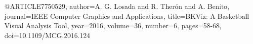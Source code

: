 @ARTICLE{7750529,
  author={A. G. {Losada} and R. {Therón} and A. {Benito}},
  journal={IEEE Computer Graphics and Applications}, 
  title={BKViz: A Basketball Visual Analysis Tool}, 
  year={2016},
  volume={36},
  number={6},
  pages={58-68},
  doi={10.1109/MCG.2016.124}}